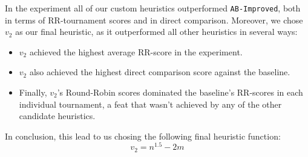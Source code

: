 \documentclass{article}
\theoremstyle{plain}
\theoremstyle{definition}
\theoremstyle{remark}
\begin{document}
In the experiment all of our custom heuristics outperformed \texttt{AB-Improved}, both in terms of RR-tournament scores and in direct comparison.
Moreover, we chose $v_2$ as our final heuristic, as it outperformed all other heuristics in several ways:

\begin{itemize}
	\item $v_2$ achieved the highest average RR-score in the experiment.
	\item $v_2$ also achieved the highest direct comparison score against the baseline.
	\item Finally, $v_2$'s Round-Robin scores dominated the baseline's RR-scores in each individual tournament, a feat that wasn't achieved by any of the other candidate heuristics.
\end{itemize}

In conclusion, this lead to us chosing the following final heuristic function:
$$ v_2 = n^{1.5} - 2m$$

% 
\end{document}
